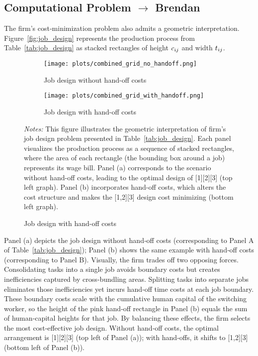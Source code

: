 \documentclass{article}
\theoremstyle{plain}
\theoremstyle{plain}
\begin{document}
\subsection{Computational Problem $\rightarrow$ Brendan}
The firm’s cost‐minimization problem also admits a geometric interpretation.  
Figure~\ref{fig:job_design} represents the production process from Table~\ref{tab:job_design} as stacked rectangles of height $c_{ij}$ and width $t_{ij}$.
\begin{figure}[htbp]
  \begin{center}
  \caption{Geometric interpretation of job designs for the \(\tau=3\) tasks example} \label{fig:job_design}
  \begin{subfigure}[b]{0.93\textwidth}
    \texttt{[image: plots/combined\_grid\_no\_handoff.png]}
    \caption{Job design without hand-off costs}
  \end{subfigure}
  \hfill
  \begin{subfigure}[b]{0.93\textwidth}
    \texttt{[image: plots/combined\_grid\_with\_handoff.png]}
    \caption{Job design with hand-off costs}
  \end{subfigure}
  \end{center}
  \footnotesize{\emph{Notes:} This figure illustrates the geometric interpretation of firm's job design problem presented in Table~\ref{tab:job_design}. Each panel visualizes the production process as a sequence of stacked rectangles, where the area of each rectangle (the bounding box around a job) represents its wage bill. Panel (a) corresponds to the scenario without hand-off costs, leading to the optimal design of [1][2][3] (top left graph). Panel (b) incorporates hand-off costs, which alters the cost structure and makes the [1,2][3] design cost minimizing (bottom left graph).}
\end{figure}
Panel (a) depicts the job design without hand‐off costs (corresponding to Panel A of Table~\ref{tab:job_design}); Panel (b) shows the same example with hand‐off costs (corresponding to Panel B).  
Visually, the firm trades off two opposing forces.
Consolidating tasks into a single job avoids boundary costs but creates inefficiencies captured by cross‐bundling areas.  
Splitting tasks into separate jobs eliminates those inefficiencies yet incurs hand‐off time costs at each job boundary.  
These boundary costs scale with the cumulative human capital of the switching worker, so the height of the pink hand‐off rectangle in Panel (b) equals the sum of human‐capital heights for that job.
By balancing these effects, the firm selects the most cost‐effective job design.  
Without hand‐off costs, the optimal arrangement is [1][2][3] (top left of Panel (a)); with hand‐offs, it shifts to [1,2][3] (bottom left of Panel (b)).  
\end{document}
